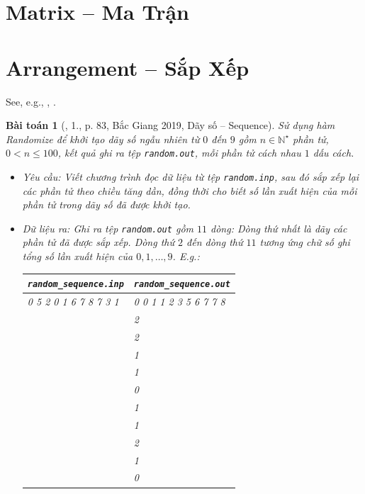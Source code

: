 \documentclass{article}
\newtheorem{baitoan}{Bài toán}
\begin{document}

\section{Matrix -- Ma Trận}


\section{Arrangement -- Sắp Xếp}
See, e.g., \cite[Chap. 5: Sorting]{Knuth1998}, \cite[Chap. II, Sect. Dạng bài sắp xếp]{VietSTEM2021}.

\begin{baitoan}[\cite{VietSTEM2021}, 1., p. 83, Bắc Giang 2019, Dãy số -- Sequence]
	Sử dụng hàm Randomize để khởi tạo dãy số ngẫu nhiên từ $0$ đến $9$ gồm $n\in\mathbb{N}^\star$ phần tử, $0 < n\le100$, kết quả ghi ra tệp \verb|random.out|, mỗi phần tử cách nhau $1$ dấu cách.
	\begin{itemize}
		\item {\sf Yêu cầu:} Viết chương trình đọc dữ liệu từ tệp \verb|random.inp|, sau đó sắp xếp lại các phần tử theo chiều tăng dần, đồng thời cho biết số lần xuất hiện của mỗi phần tử trong dãy số đã được khởi tạo.
		\item {\sf Dữ liệu ra:} Ghi ra tệp \verb|random.out| gồm $11$ dòng: Dòng thứ nhất là dãy các phần tử đã được sắp xếp. Dòng thứ $2$ đến dòng thứ $11$ tương ứng chữ số ghi tổng số lần xuất hiện của $0,1,\ldots,9$. E.g.:
		\begin{table}[H]
			\centering
			\begin{tabular}{|l|l|}
				\hline
				\verb|random_sequence.inp| & \verb|random_sequence.out| \\
				\hline
				0 5 2 0 1 6 7 8 7 3 1 & 0 0 1 1 2 3 5 6 7 7 8 \\
				& 2 \\
				& 2 \\
				& 1 \\
				& 1 \\
				& 0 \\
				& 1 \\
				& 1 \\
				& 2 \\
				& 1 \\
				& 0 \\
				\hline
			\end{tabular}
		\end{table}
	\end{itemize}
\end{baitoan}
\end{document}
